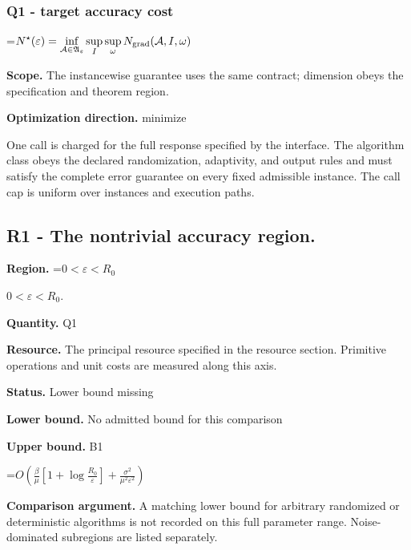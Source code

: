 \documentclass[10pt,a4paper]{article}
\newcommand{\AtlasMath}[1]{\par\begingroup\centering\setbox0=\hbox{$\displaystyle #1$}\ifdim\wd0>1.4\linewidth\typeout{ATLAS WIDE FORMULA: \the\wd0}\fi\ifdim\wd0>\linewidth\resizebox{\linewidth}{!}{\box0}\else\box0\fi\par\endgroup}
\newcommand{\AtlasInlineMath}[1]{\begingroup\setbox0=\hbox{$#1$}\ifdim\wd0>.4\linewidth\endgroup\AtlasMath{#1}\else\endgroup$#1$\fi}
\begin{document}
\subsubsection{Q1 - target accuracy cost}


\AtlasMath{N^\star(\varepsilon)=\inf_{\mathcal A\in\mathfrak A_\varepsilon}\sup_I \sup_\omega N_{\rm grad}(\mathcal A,I,\omega)}


\textbf{Scope.} The instancewise guarantee uses the same contract; dimension obeys the specification and theorem region.



\textbf{Optimization direction.} minimize



One call is charged for the full response specified by the interface. The algorithm class obeys the declared randomization, adaptivity, and output rules and must satisfy the complete error guarantee on every fixed admissible instance. The call cap is uniform over instances and execution paths.



\subsection{R1 - The nontrivial accuracy region.}


\textbf{Region.} \AtlasInlineMath{0<\varepsilon<R_0}.



\textbf{Quantity.} Q1



\textbf{Resource.} The principal resource specified in the resource section. Primitive operations and unit costs are measured along this axis.



\textbf{Status.} Lower bound missing



\textbf{Lower bound.} No admitted bound for this comparison



\textbf{Upper bound.} B1



\AtlasMath{O\!\left(\frac{\beta}{\mu}\left[1+\log\frac{R_0}{\varepsilon}\right]+\frac{\sigma^2}{\mu^2\varepsilon^2}\right)}


\textbf{Comparison argument.} A matching lower bound for arbitrary randomized or deterministic algorithms is not recorded on this full parameter range. Noise-dominated subregions are listed separately.
\end{document}
